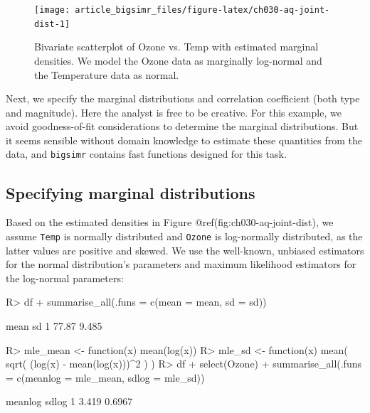 \documentclass[
]{jss}
\begin{document}
\begin{CodeChunk}
\begin{figure}

{\centering \texttt{[image: article\_bigsimr\_files/figure-latex/ch030-aq-joint-dist-1]} 

}

\caption[Bivariate scatterplot of Ozone vs]{Bivariate scatterplot of Ozone vs. Temp with estimated marginal densities. We model the Ozone data as marginally log-normal and the Temperature data as normal.}\label{fig:ch030-aq-joint-dist}
\end{figure}
\end{CodeChunk}

Next, we specify the marginal distributions and correlation coefficient
(both type and magnitude). Here the analyst is free to be creative. For
this example, we avoid goodness-of-fit considerations to determine the
marginal distributions. But it seems sensible without domain knowledge
to estimate these quantities from the data, and \texttt{bigsimr}
contains fast functions designed for this task.

\hypertarget{specifying-marginal-distributions}{%
\subsection{Specifying marginal
distributions}\label{specifying-marginal-distributions}}

Based on the estimated densities in Figure
@ref(fig:ch030-aq-joint-dist), we assume \texttt{Temp} is normally
distributed and \texttt{Ozone} is log-normally distributed, as the
latter values are positive and skewed. We use the well-known, unbiased
estimators for the normal distribution's parameters and maximum
likelihood estimators for the log-normal parameters:

\begin{CodeChunk}
\begin{CodeInput}
R> df %
+   summarise_all(.funs = c(mean = mean, sd = sd))
\end{CodeInput}
\begin{CodeOutput}
   mean    sd
1 77.87 9.485
\end{CodeOutput}
\end{CodeChunk}

\begin{CodeChunk}
\begin{CodeInput}
R> mle_mean <- function(x) mean(log(x))
R> mle_sd <- function(x) mean( sqrt( (log(x) - mean(log(x)))^2 ) )
R> df %
+   select(Ozone) %
+   summarise_all(.funs = c(meanlog = mle_mean, sdlog = mle_sd))
\end{CodeInput}
\begin{CodeOutput}
  meanlog  sdlog
1   3.419 0.6967
\end{CodeOutput}
\end{CodeChunk}
\end{document}
